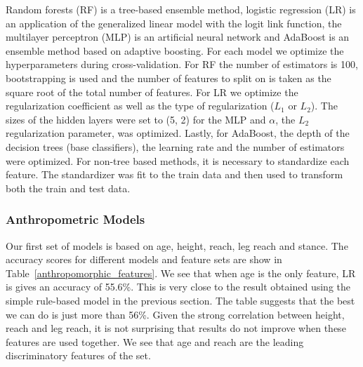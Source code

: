 Random forests (RF) is a tree-based ensemble method,
logistic regression (LR) is an application of the generalized
linear model with the logit link function, the multilayer perceptron (MLP)
is an artificial neural network and AdaBoost is
an ensemble method based on adaptive boosting.
For each model we optimize the hyperparameters
during cross-validation. For RF the
number of estimators is 100, bootstrapping is used
and the number of features to split on is taken
as the square root of the total number of features.
For LR we optimize the regularization coefficient
as well as the type of regularization ($L_1$ or $L_2$).
The sizes of the hidden layers were set to (5, 2) for
the MLP and $\alpha$, the $L_2$ regularization parameter, was optimized.
Lastly, for AdaBoost, the depth of the decision trees
(base classifiers), the learning rate and the number
of estimators were optimized.
For non-tree based methods, it is necessary to standardize
each feature. The standardizer was fit to the train data
and then used to transform both the train and test data.

\subsubsection*{Anthropometric Models}

Our first set of models is based on age, height,
reach, leg reach and stance. The accuracy scores
for different models and feature sets are show
in Table~\ref{anthropomorphic_features}.
We see that when age is the only feature, LR is gives
an accuracy of 55.6\%. This is very close to the result obtained using the simple
rule-based model in the previous section. The table
suggests that the best we can do is just more than
56\%. Given the strong correlation between height, reach
and leg reach, it is not surprising that results do not
improve when these features are used together. We see that
age and reach are the leading discriminatory features of the set.

